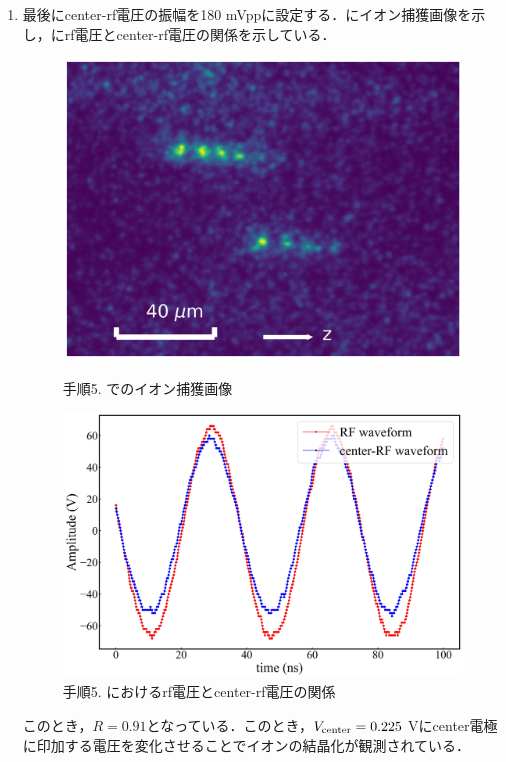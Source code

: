\begin{enumerate}
\item 最後にcenter-rf電圧の振幅を180 mVppに設定する．にイオン捕獲画像を示し，にrf電圧とcenter-rf電圧の関係を示している．

\begin{figure}[h]
	\begin{minipage}{0.48\linewidth}
	\begin{center}
		\includegraphics[width = 0.6\columnwidth]{./methods/figure/5_2D.jpg}
		\caption{手順5. でのイオン捕獲画像}
		\label{fig:5_2D}
	\end{center}
	\end{minipage}
	\begin{minipage}{0.48\linewidth}
		\begin{center}
			\includegraphics[width = 0.9\columnwidth]{./methods/figure/5_2D_wave.jpg}
			\caption{手順5. におけるrf電圧とcenter-rf電圧の関係}
			\label{fig:5_2D_wave}
		\end{center}
	\end{minipage}
\end{figure}

このとき，$R=0.91$となっている．このとき，$V_{\rm center} = 0.225$ Vにcenter電極に印加する電圧を変化させることでイオンの結晶化が観測されている．

\end{enumerate}

